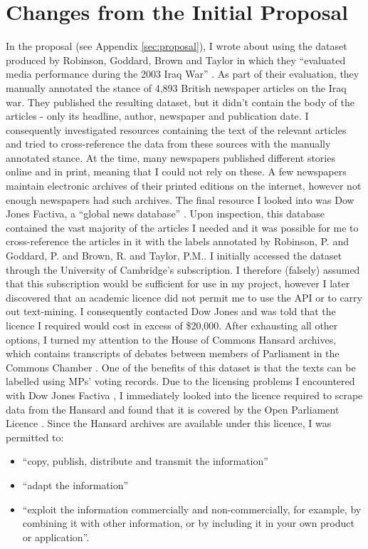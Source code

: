 \documentclass[12pt,a4paper,twoside,openright]{report}
\begin{document}
\section{Changes from the Initial Proposal} \label{prep-changes}
In the proposal (see Appendix \ref{sec:proposal}), I wrote about using the dataset produced by Robinson, Goddard, Brown and Taylor in which they ``evaluated media performance during the 2003 Iraq War'' \cite{iraq_media_study}. As part of their evaluation, they manually annotated the stance of 4,893 British newspaper articles on the Iraq war. They published the resulting dataset, but it didn't contain the body of the articles - only its headline, author, newspaper and publication date. I consequently investigated resources containing the text of the relevant articles and tried to cross-reference the data from these sources with the manually annotated stance. At the time, many newspapers published different stories online and in print, meaning that I could not rely on these. A few newspapers maintain electronic archives of their printed editions on the internet, however not enough newspapers had such archives. The final resource I looked into was Dow Jones Factiva, a ``global news database'' \cite{factiva}. Upon inspection, this database contained the vast majority of the articles I needed and it was possible for me to cross-reference the articles in it with the labels annotated by Robinson, P. and Goddard, P. and Brown, R. and Taylor, P.M.. I initially accessed the dataset through the University of Cambridge's subscription. I therefore (falsely) assumed that this subscription would be sufficient for use in my project, however I later discovered that an academic licence did not permit me to use the API or to carry out text-mining. I consequently contacted Dow Jones and was told that the licence I required would cost in excess of \$20,000.
\newline
\newline
After exhausting all other options, I turned my attention to the House of Commons Hansard archives, which contains transcripts of debates between members of Parliament in the Commons Chamber \cite{hansard}. One of the benefits of this dataset is that the texts can be labelled using MPs' voting records.
\newline
\newline
Due to the licensing problems I encountered with Dow Jones Factiva \cite{factiva}, I immediately looked into the licence required to scrape data from the Hansard and found that it is covered by the Open Parliament Licence \cite{open_parliament_licence}. Since the Hansard archives are available under this licence, I was permitted to:
\begin{itemize}
	\item ``copy, publish, distribute and transmit the information''
	\item ``adapt the information''
	\item ``exploit the information commercially and non-commercially, for example, by combining it with other information, or by including it in your own product or application''.
\end{itemize}
\end{document}

